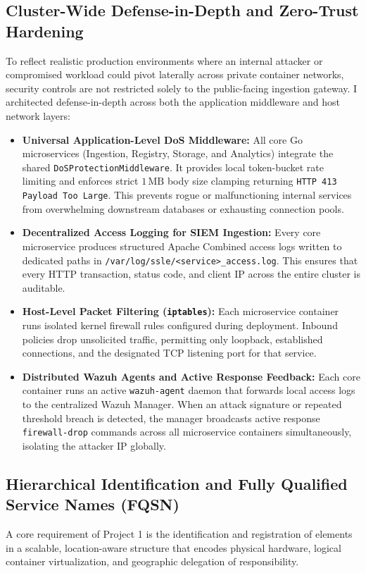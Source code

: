 \subsection{Cluster-Wide Defense-in-Depth and Zero-Trust Hardening}
To reflect realistic production environments where an internal attacker or compromised workload could pivot laterally across private container networks, security controls are not restricted solely to the public-facing ingestion gateway. I architected defense-in-depth across both the application middleware and host network layers:
\begin{itemize}
    \item \textbf{Universal Application-Level DoS Middleware:} All core Go microservices (Ingestion, Registry, Storage, and Analytics) integrate the shared \texttt{DoSProtectionMiddleware}. It provides local token-bucket rate limiting and enforces strict $1\,\text{MB}$ body size clamping returning \texttt{HTTP 413 Payload Too Large}. This prevents rogue or malfunctioning internal services from overwhelming downstream databases or exhausting connection pools.
    \item \textbf{Decentralized Access Logging for SIEM Ingestion:} Every core microservice produces structured Apache Combined access logs written to dedicated paths in \texttt{/var/log/ssle/}\allowbreak\texttt{<service>\_access.log}. This ensures that every HTTP transaction, status code, and client IP across the entire cluster is auditable.
    \item \textbf{Host-Level Packet Filtering (\texttt{iptables}):} Each microservice container runs isolated kernel firewall rules configured during deployment. Inbound policies drop unsolicited traffic, permitting only loopback, established connections, and the designated TCP listening port for that service.
    \item \textbf{Distributed Wazuh Agents and Active Response Feedback:} Each core container runs an active \texttt{wazuh-agent} daemon that forwards local access logs to the centralized Wazuh Manager. When an attack signature or repeated threshold breach is detected, the manager broadcasts active response \texttt{firewall-drop} commands across all microservice containers simultaneously, isolating the attacker IP globally.
\end{itemize}

\subsection{Hierarchical Identification and Fully Qualified Service Names (FQSN)}
A core requirement of Project 1 is the identification and registration of elements in a scalable, location-aware structure that encodes physical hardware, logical container virtualization, and geographic delegation of responsibility.

